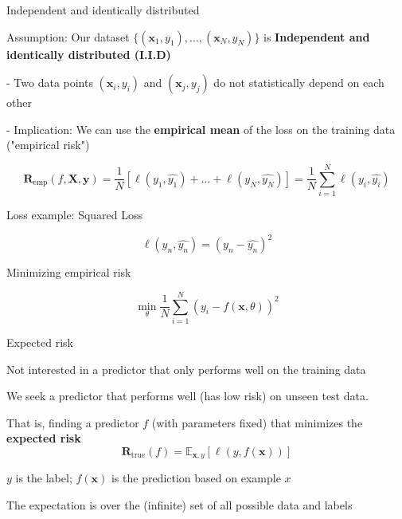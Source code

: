 \documentclass[12pt]{beamer}
\begin{document}
\begin{frame}{Independent and identically distributed}

Assumption: Our dataset  $\{(\mathbf{x}_1, y_1), \dots,  (\mathbf{x}_N, y_N)\}$ is \textbf{Independent and identically distributed (I.I.D)}

- Two data points $(\mathbf{x}_i, y_i)$ and $(\mathbf{x}_j, y_j)$ do not statistically depend on each other

- Implication: We can use the \textbf{empirical mean} of the loss on the training data ("empirical risk")

$$
\mathbf{R}_{\mathrm{emp}} (f, \mathbf{X}, \mathbf{y}) = 
\frac{1}{N} \left[ \ell(y_1, \hat{y_1}) + \dots + \ell(y_N, \hat{y_N}) \right] =
\frac{1}{N} \sum_{i = 1}^{N} \ell(y_i, \hat{y_i}) 
$$

\end{frame}

\begin{frame}{Loss example: Squared Loss}

$$
\ell(y_n, \hat{y_n}) = (y_n - \hat{y_n})^2
$$

Minimizing empirical risk

$$
\min_{\theta} \frac{1}{N} \sum_{i = 1}^{N} (y_i - f(\mathbf{x}, \theta))^2
$$


\end{frame}

\begin{frame}{Expected risk}
	
Not interested in a predictor that only performs well on the training data

We seek a predictor that performs well (has low risk) on unseen test data.

That is, finding a predictor $f$ (with parameters fixed) that minimizes the \textbf{expected risk}
$$
\mathbf{R}_{\mathrm{true}} (f) = \mathbb{E}_{\mathbf{x}, y}
\left[ \ell (y, f(\mathbf{x}))   \right]
$$

$y$ is the label; $f(\mathbf{x})$ is the prediction based on example $x$


The expectation is over the (infinite) set of all possible data and labels

\end{frame}
\end{document}
